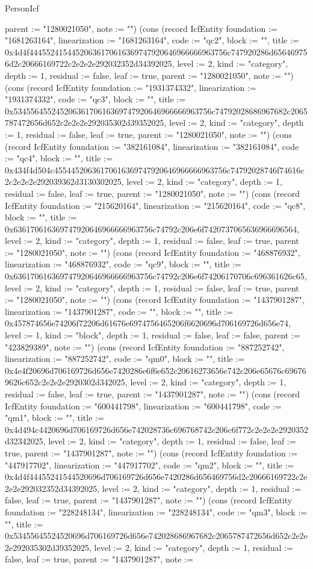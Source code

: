 \begin{lexlean}{PersonIcf}
\begin{semanticmodule}
{parent := "1280021050", note := ""}) (cons (record IcfEntity {foundation := "1681263164", linearization := "1681263164", code := "qc2", block := "", title := 0x4d4f44455241544520636170616369747920646966666963756c747920286d656469756d2c20666169722c2e2e2e292032352d34392025, level := 2, kind := "category", depth := 1, residual := false, leaf := true, parent := "1280021050", note := ""}) (cons (record IcfEntity {foundation := "1931374332", linearization := "1931374332", code := "qc3", block := "", title := 0x53455645524520636170616369747920646966666963756c74792028686967682c2065787472656d652c2e2e2e292035302d39352025, level := 2, kind := "category", depth := 1, residual := false, leaf := true, parent := "1280021050", note := ""}) (cons (record IcfEntity {foundation := "382161084", linearization := "382161084", code := "qc4", block := "", title := 0x434f4d504c45544520636170616369747920646966666963756c74792028746f74616c2c2e2e2e292039362d3130302025, level := 2, kind := "category", depth := 1, residual := false, leaf := true, parent := "1280021050", note := ""}) (cons (record IcfEntity {foundation := "215620164", linearization := "215620164", code := "qc8", block := "", title := 0x636170616369747920646966666963756c74792c206e6f7420737065636966696564, level := 2, kind := "category", depth := 1, residual := false, leaf := true, parent := "1280021050", note := ""}) (cons (record IcfEntity {foundation := "468876932", linearization := "468876932", code := "qc9", block := "", title := 0x636170616369747920646966666963756c74792c206e6f74206170706c696361626c65, level := 2, kind := "category", depth := 1, residual := false, leaf := true, parent := "1280021050", note := ""}) (cons (record IcfEntity {foundation := "1437901287", linearization := "1437901287", code := "", block := "", title := 0x457874656e74206f72206d61676e6974756465206f6620696d706169726d656e74, level := 1, kind := "block", depth := 1, residual := false, leaf := false, parent := "423829389", note := ""}) (cons (record IcfEntity {foundation := "887252742", linearization := "887252742", code := "qm0", block := "", title := 0x4e4f20696d706169726d656e7420286e6f6e652c20616273656e742c206e65676c696769626c652c2e2e2e2920302d342025, level := 2, kind := "category", depth := 1, residual := false, leaf := true, parent := "1437901287", note := ""}) (cons (record IcfEntity {foundation := "600441798", linearization := "600441798", code := "qm1", block := "", title := 0x4d494c4420696d706169726d656e742028736c696768742c206c6f772c2e2e2e2920352d32342025, level := 2, kind := "category", depth := 1, residual := false, leaf := true, parent := "1437901287", note := ""}) (cons (record IcfEntity {foundation := "447917702", linearization := "447917702", code := "qm2", block := "", title := 0x4d4f44455241544520696d706169726d656e7420286d656469756d2c20666169722c2e2e2e292032352d34392025, level := 2, kind := "category", depth := 1, residual := false, leaf := true, parent := "1437901287", note := ""}) (cons (record IcfEntity {foundation := "228248134", linearization := "228248134", code := "qm3", block := "", title := 0x53455645524520696d706169726d656e742028686967682c2065787472656d652c2e2e2e292035302d39352025, level := 2, kind := "category", depth := 1, residual := false, leaf := true, parent := "1437901287", note := }
\end{semanticmodule}
\end{lexlean}

